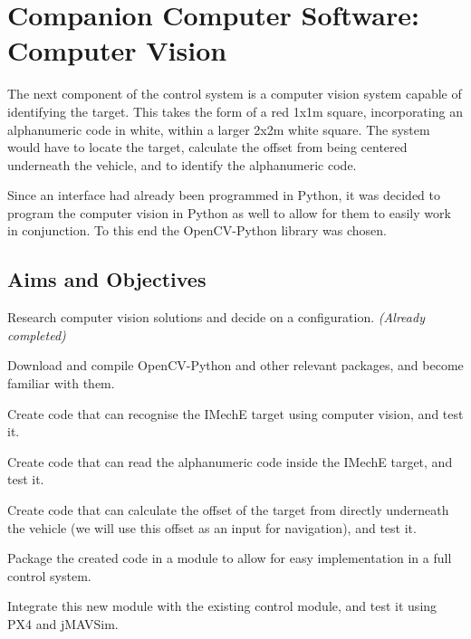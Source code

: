 \documentclass[11pt,twoside]{article}
\begin{document}
\section{Companion Computer Software: Computer Vision}
The next component of the control system is a computer vision system capable of identifying the target. This takes the form of a red 1x1m square, incorporating an alphanumeric code in white, within a larger 2x2m white square\cite{IMechE_rules}. The system would have to locate the target, calculate the offset from being centered underneath the vehicle, and to identify the alphanumeric code.

Since an interface had already been programmed in Python, it was decided to program the computer vision in Python as well to allow for them to easily work in conjunction. To this end the OpenCV-Python library was chosen.

\subsection{Aims and Objectives}
\begin{compactenum}
    \item Research computer vision solutions and decide on a configuration. \emph{(Already completed)}
    \item Download and compile OpenCV-Python and other relevant packages, and become familiar with them.
    \item Create code that can recognise the IMechE target using computer vision, and test it.
    \item Create code that can read the alphanumeric code inside the IMechE target, and test it.
    \item Create code that can calculate the offset of the target from directly underneath the vehicle (we will use this offset as an input for navigation), and test it.
    \item Package the created code in a module to allow for easy implementation in a full control system.
    \item Integrate this new module with the existing control module, and test it using PX4 and jMAVSim.
\end{compactenum}
\end{document}
